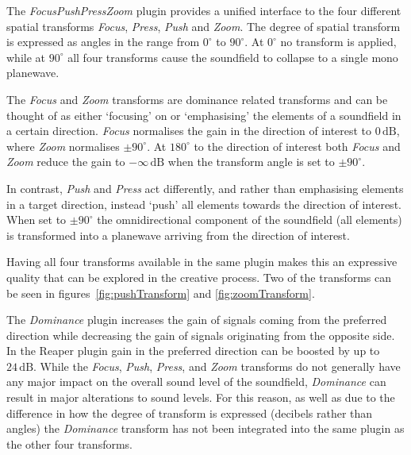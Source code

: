 \documentclass{article}
\begin{document}
The \emph{FocusPushPressZoom} plugin provides a unified interface to the four different spatial transforms \emph{Focus}, \emph{Press}, \emph{Push} and \emph{Zoom}.
The degree of spatial transform is expressed as angles in the range from $0^\circ$ to $90^\circ$. 
At $0^\circ$ no transform is applied, while at $90^\circ$ all four transforms cause the soundfield to collapse to a single mono planewave.

The \emph{Focus} and \emph{Zoom} transforms are dominance related transforms and can be thought of as either `focusing' on or `emphasising' the elements of a soundfield in a certain direction. \emph{Focus} normalises the gain in the direction of interest to $0\,\mathrm{dB}$, where \emph{Zoom} normalises $\pm90^\circ$. At $180^\circ$ to the direction of interest both \emph{Focus} and \emph{Zoom} reduce the gain to $-\infty\,\mathrm{dB}$ when the transform angle is set to $\pm90^\circ$.

In contrast, \emph{Push} and \emph{Press} act differently, and rather than emphasising elements in a target direction, instead `push' all elements towards the direction of interest. When set to $\pm90^\circ$ the omnidirectional component of the soundfield (all elements) is transformed into a planewave arriving from the direction of interest.



Having all four transforms available in the same plugin makes this an expressive quality that can be explored in the creative process.
Two of the transforms can be seen in figures~\ref{fig:pushTransform} and \ref{fig:zoomTransform}.

The \emph{Dominance} plugin increases the gain of signals coming from the preferred direction while decreasing the gain of signals originating from the opposite side.
In the Reaper plugin gain in the preferred direction can be boosted by up to $24\,\mathrm{dB}$.
While the \emph{Focus}, \emph{Push}, \emph{Press}, and \emph{Zoom} transforms do not generally have any major impact on the overall sound level of the soundfield, \emph{Dominance} can result in major alterations to sound levels.
For this reason, as well as due to the difference in how the degree of transform is expressed (decibels rather than angles) the \emph{Dominance} transform has not been integrated into the same plugin as the other four transforms.
\end{document}
